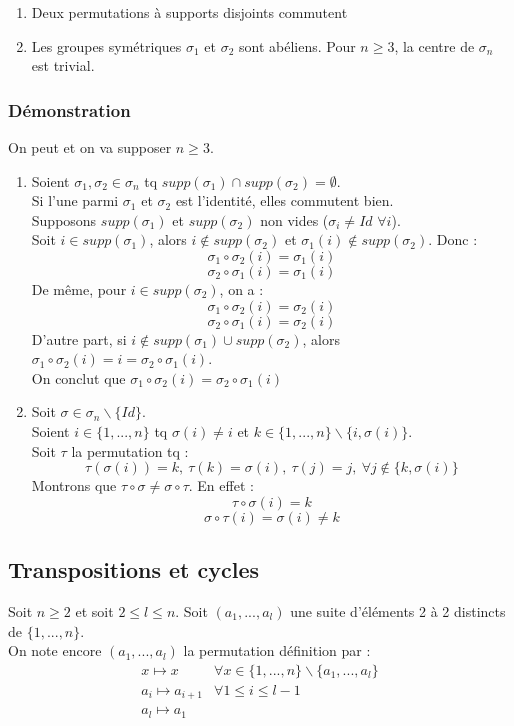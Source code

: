 \documentclass[a4paper, oneside]{report}
\theoremstyle{break}
\newcommand{\dem}{\subsubsection{Démonstration}}
\begin{document}
\propr
\begin{enumerate}
\item Deux permutations à supports disjoints commutent
\item Les groupes symétriques $\sigma_1$ et $\sigma_2$ sont abéliens. Pour $n\geq 3$, la centre de $\sigma_n$ est trivial.
\end{enumerate}

\dem
On peut et on va supposer $n\geq 3$.
\begin{enumerate}
\item Soient $\sigma_1,\sigma_2 \in \sigma_n$ tq $supp(\sigma_1)\cap supp(\sigma_2) = \emptyset$.\\
Si l'une parmi $\sigma_1$ et $\sigma_2$ est l'identité, elles commutent bien.\\
Supposons $supp(\sigma_1)$ et $supp(\sigma_2)$ non vides ($\sigma_i \neq Id$ $\forall i$).\\
Soit $i\in supp(\sigma_1)$, alors $i\notin supp(\sigma_2)$ et $\sigma_1(i)\notin supp(\sigma_2)$. Donc :
$$\sigma_1 \circ \sigma_2(i)=\sigma_1(i)$$
$$\sigma_2 \circ \sigma_1(i)=\sigma_1(i)$$
De même, pour $i\in supp(\sigma_2)$, on a :
$$\sigma_1 \circ \sigma_2(i)=\sigma_2(i)$$
$$\sigma_2 \circ \sigma_1(i)=\sigma_2(i)$$
D'autre part, si $i\notin supp(\sigma_1)\cup supp(\sigma_2)$, alors $\sigma_1 \circ \sigma_2(i) = i = \sigma_2 \circ \sigma_1(i)$.\\
On conclut que $\sigma_1 \circ \sigma_2(i)= \sigma_2 \circ \sigma_1(i)$

\item Soit $\sigma \in \sigma_n \backslash \{Id\}$.\\
Soient $i\in \{1,...,n\}$ tq $\sigma(i)\neq i$ et $k\in \{1,...,n\}\backslash \{i, \sigma(i) \}$.\\
Soit $\tau$ la permutation tq :
$$\tau(\sigma (i))=k,~\tau(k)=\sigma(i),~\tau(j)=j,~\forall j\notin \{k,\sigma(i) \}$$
Montrons que $\tau \circ \sigma \neq \sigma \circ \tau$. En effet :
$$\tau \circ \sigma (i) = k$$
$$\sigma \circ \tau (i) = \sigma(i) \neq k$$
\end{enumerate}

\subsection{Transpositions et cycles}

Soit $n\geq 2$ et soit $2 \leq l \leq n$. Soit $(a_1,...,a_l)$ une suite d'éléments 2 à 2 distincts de $\{1,...,n\}$. \\
On note encore $(a_1,...,a_l)$ la permutation définition par :
$$\begin{array}{ll}
x\mapsto x & \forall x \in \{1,...,n \}\backslash \{a_1,...,a_l\}\\
a_i\mapsto a_{i+1}& \forall 1\leq i \leq l-1\\
a_l\mapsto a_1&
\end{array}
$$
\end{document}
